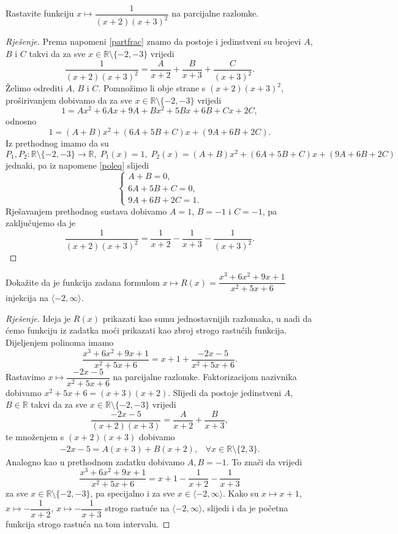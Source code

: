\begin{exercise}
Rastavite funkciju $x\mapsto \dfrac{1}{(x+2)(x+3)^2}$ na parcijalne razlomke.
\end{exercise}
\begin{proof}[Rješenje]
Prema napomeni \ref{partfrac} znamo da postoje i jedinstveni su brojevi $A$, $B$ i $C$ takvi da za sve $x\in \mathbb{R}\setminus\{-2, -3\}$ vrijedi
$$\dfrac{1}{(x+2)(x+3)^2}=\dfrac{A}{x+2}+\dfrac{B}{x+3}+\dfrac{C}{(x+3)^2}.$$
Želimo odrediti $A$, $B$ i $C$. Pomnožimo li obje strane s $(x+2)(x+3)^2$, proširivanjem dobivamo da za sve $x\in \mathbb{R}\setminus\{-2, -3\}$ vrijedi
$$1=Ax^2+6Ax+9A+Bx^2+5Bx+6B+Cx+2C,$$
odnosno
$$1=(A+B)x^2+(6A+5B+C)x+(9A+6B+2C).$$
Iz prethodnog imamo da su $$P_1, P_2 : \mathbb{R}\setminus\{-2, -3\}\to \mathbb{R},\;P_1(x)=1,\; P_2(x)= (A+B)x^2+(6A+5B+C)x+(9A+6B+2C)$$ jednaki, pa iz napomene \ref{poleq} slijedi
$$\begin{cases}
A+B=0, \\
6A+5B+C=0, \\
9A+6B+2C=1.
   \end{cases}$$
Rješavanjem prethodnog sustava dobivamo $A=1$, $B=-1$ i $C=-1$, pa zaključujemo da je
$$\dfrac{1}{(x+2)(x+3)^2}=\dfrac{1}{x+2}-\dfrac{1}{x+3}-\dfrac{1}{(x+3)^2}.$$
\end{proof}
\begin{exercise}
Dokažite da je funkcija zadana formulom $x\mapsto R(x)=\dfrac{x^3+6x^2+9x+1}{x^2+5x+6}$ injekcija na $\langle -2, \infty\rangle$.
\end{exercise}
\begin{proof}[Rješenje]
Ideja je $R(x)$ prikazati kao sumu jednostavnijih razlomaka, u nadi da ćemo funkciju iz zadatka moći prikazati kao zbroj strogo rastućih funkcija. Dijeljenjem polinoma imamo
$$\dfrac{x^3+6x^2+9x+1}{x^2+5x+6}=x+1+\dfrac{-2x-5}{x^2+5x+6}.$$
Rastavimo $x\mapsto \dfrac{-2x-5}{x^2+5x+6}$ na parcijalne razlomke. Faktorizacijom nazivnika dobivamo $x^2+5x+6=(x+3)(x+2)$. Slijedi da postoje jedinstveni $A$, $B\in \mathbb{R}$ takvi da za sve $x\in \mathbb{R}\setminus\{-2, -3\}$ vrijedi
$$\dfrac{-2x-5}{(x+2)(x+3)}=\dfrac{A}{x+2}+\dfrac{B}{x+3},$$
te množenjem s $(x+2)(x+3)$ dobivamo 
\begin{gather}
\label{partfrac2}
-2x-5=A(x+3)+B(x+2),\;\;\; \forall x\in \mathbb{R}\setminus\{2, 3\}.
\end{gather}
Analogno kao u prethodnom zadatku dobivamo $A, B=-1$. To znači da vrijedi
$$\dfrac{x^3+6x^2+9x+1}{x^2+5x+6}=x+1-\dfrac{1}{x+2}-\dfrac{1}{x+3}$$
za sve $x\in \mathbb{R}\setminus\{-2, -3\}$, pa specijalno i za sve $x\in\langle -2,\infty \rangle$. Kako su $x\mapsto x+1$, $x\mapsto -\dfrac{1}{x+2}$, $x\mapsto -\dfrac{1}{x+3}$ strogo rastuće na $\langle -2,\infty \rangle$, slijedi i da je početna funkcija strogo rastuća na tom intervalu.
\end{proof}
